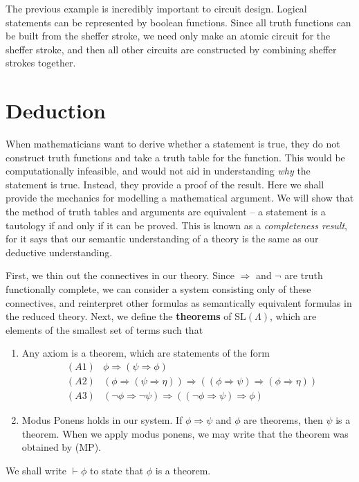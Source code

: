 The previous example is incredibly important to circuit design. Logical statements can be represented by boolean functions. Since all truth functions can be built from the sheffer stroke, we need only make an atomic circuit for the sheffer stroke, and then all other circuits are constructed by combining sheffer strokes together.




\section{Deduction}

When mathematicians want to derive whether a statement is true, they do not construct truth functions and take a truth table for the function. This would be computationally infeasible, and would not aid in understanding {\it why} the statement is true. Instead, they provide a proof of the result. Here we shall provide the mechanics for modelling a mathematical argument. We will show that the method of truth tables and arguments are equivalent -- a statement is a tautology if and only if it can be proved. This is known as a {\it completeness result}, for it says that our semantic understanding of a theory is the same as our deductive understanding.

First, we thin out the connectives in our theory. Since $\Rightarrow$ and $\neg$ are truth functionally complete, we can consider a system consisting only of these connectives, and reinterpret other formulas as semantically equivalent formulas in the reduced theory. Next, we define the {\bf theorems} of $\text{SL}(\Lambda)$, which are elements of the smallest set of terms such that
    \begin{enumerate}
        \item Any axiom is a theorem, which are statements of the form
        \begin{align*}
            &(A1) & \phi \Rightarrow (\psi \Rightarrow \phi)\\
            &(A2) & (\phi \Rightarrow (\psi \Rightarrow \eta)) \Rightarrow ((\phi \Rightarrow \psi) \Rightarrow (\phi \Rightarrow \eta))\\
            &(A3) & (\neg \phi \Rightarrow \neg \psi) \Rightarrow ((\neg \phi \Rightarrow \psi) \Rightarrow \phi)
        \end{align*}
        \item Modus Ponens holds in our system. If $\phi \Rightarrow \psi$ and $\phi$ are theorems, then $\psi$ is a theorem. When we apply modus ponens, we may write that the theorem was obtained by (MP).
    \end{enumerate}
We shall write $\vdash \phi$ to state that $\phi$ is a theorem.


